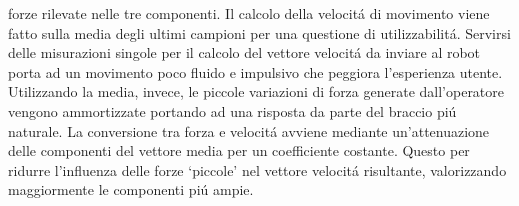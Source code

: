 forze rilevate nelle tre componenti. Il calcolo della velocit\'{a} di movimento viene fatto sulla media degli ultimi campioni 
per una questione di utilizzabilit\'{a}. Servirsi delle misurazioni singole per il calcolo del vettore velocit\'{a} da inviare al robot 
porta ad un movimento poco fluido e impulsivo che peggiora l'esperienza utente. Utilizzando la media, invece, le piccole variazioni 
di forza generate dall'operatore vengono ammortizzate portando ad una risposta da parte del braccio pi\'{u} naturale.
La conversione tra forza e velocit\'{a} avviene mediante un'attenuazione delle componenti del vettore media per un coefficiente 
costante. Questo per ridurre l'influenza delle forze `piccole' nel vettore velocit\'{a} risultante, valorizzando maggiormente le 
componenti pi\'{u} ampie. 